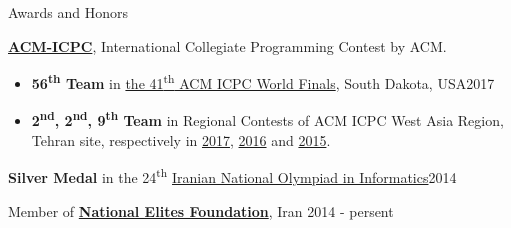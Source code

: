 \documentclass{resume} %
\begin{document}
\begin{rSection}{Awards and Honors}
	
	{\bf \href{http://icpc.baylor.edu/}{ACM-ICPC}}, International Collegiate Programming Contest by ACM.
	\begin{itemize}
		\item {\bf 56\textsuperscript{th} Team} in
		\href{https://icpc.baylor.edu/community/results-2017}{the 41\textsuperscript{th} ACM ICPC World Finals},
		South Dakota, USA\hfill 2017
		
		\item {\bf 2\textsuperscript{nd}, 2\textsuperscript{nd}, 9\textsuperscript{th} Team} in Regional Contests of ACM ICPC West Asia Region,
		Tehran site, respectively in
		\href{http://icpc.sharif.edu/acmicpc17/scoreboard/}{2017},
		\href{http://icpc.sharif.edu/acmicpc16/scoreboard/}{2016} and
		\href{http://icpc.sharif.edu/acmicpc15/scoreboard/}{2015}.
	\end{itemize}
	
	{\bf Silver Medal} in the 24\textsuperscript{th} \href{http://inoi.ir/}{Iranian National Olympiad in Informatics}\hfill 2014
	
	Member of \href{https://www.bmn.ir/}{{\bf National Elites Foundation}}, Iran \hfill 2014 - persent
	
\end{rSection}

\end{document}
